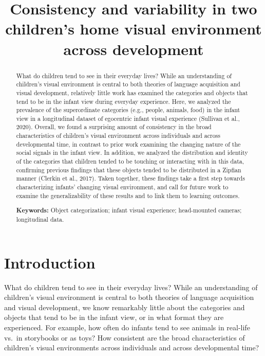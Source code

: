 \documentclass[10pt, letterpaper]{article}
\title{Consistency and variability in two children's home visual environment
across development}
\author{}
\begin{document}
\maketitle

\begin{abstract}
What do children tend to see in their everyday lives? While an
understanding of children's visual environment is central to both
theories of language acquisition and visual development, relatively
little work has examined the categories and objects that tend to be in
the infant view during everyday experience. Here, we analyzed the
prevalence of the superordinate categories (e.g., people, animals, food)
in the infant view in a longitudinal dataset of egocentric infant visual
experience (Sullivan et al., 2020). Overall, we found a surprising
amount of consistency in the broad characteristics of children's visual
environment across individuals and across developmental time, in
contrast to prior work examining the changing nature of the social
signals in the infant view. In addition, we analyzed the distribution
and identity of the categories that children tended to be touching or
interacting with in this data, confirming previous findings that these
objects tended to be distributed in a Zipfian manner (Clerkin et al.,
2017). Taken together, these findings take a first step towards
characterizing infants' changing visual environment, and call for future
work to examine the generalizability of these results and to link them
to learning outcomes.

\textbf{Keywords:}
Object categorization; infant visual experience; head-mounted cameras;
longitudinal data.
\end{abstract}

\hypertarget{introduction}{%
\section{Introduction}\label{introduction}}

What do children tend to see in their everyday lives? While an
understanding of children's visual environment is central to both
theories of language acquisition and visual development, we know
remarkably little about the categories and objects that tend to be in
the infant view, or in what format they are experienced. For example,
how often do infants tend to see animals in real-life vs.~in storybooks
or as toys? How consistent are the broad characteristics of children's
visual environments across individuals and across developmental time?
\end{document}
